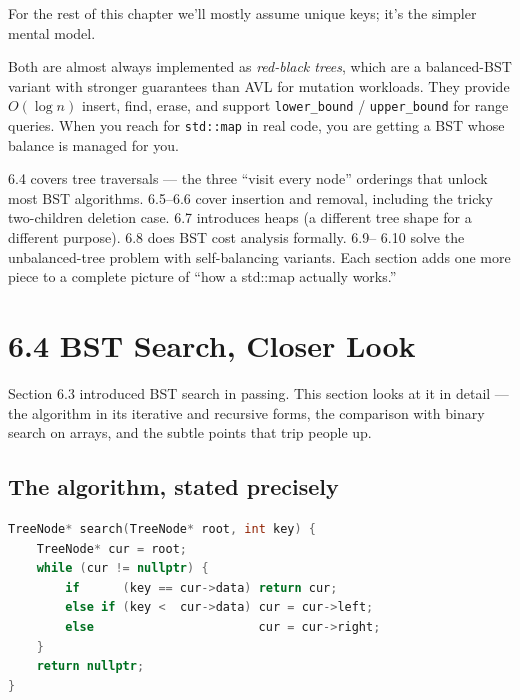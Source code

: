\documentclass[11pt]{article}
\begin{document}
For the rest of this chapter we'll mostly assume unique keys;
it's the simpler mental model.

\begin{notebox}
Both are almost always implemented as \emph{red-black trees},
which are a balanced-BST variant with stronger guarantees than
AVL for mutation workloads. They provide $O(\log n)$ insert,
find, erase, and support \texttt{lower\_bound} /
\texttt{upper\_bound} for range queries. When you reach for
\texttt{std::map} in real code, you are getting a BST whose
balance is managed for you.
\end{notebox}

\begin{ideabox}
6.4 covers tree traversals --- the three ``visit every node''
orderings that unlock most BST algorithms. 6.5--6.6 cover
insertion and removal, including the tricky two-children deletion
case. 6.7 introduces heaps (a different tree shape for a
different purpose). 6.8 does BST cost analysis formally. 6.9--
6.10 solve the unbalanced-tree problem with self-balancing
variants. Each section adds one more piece to a complete picture
of ``how a std::map actually works.''
\end{ideabox}

\section{6.4 BST Search, Closer Look}

Section 6.3 introduced BST search in passing. This section
looks at it in detail --- the algorithm in its iterative and
recursive forms, the comparison with binary search on arrays,
and the subtle points that trip people up.

\subsection*{The algorithm, stated precisely}

\begin{examplebox}
\begin{lstlisting}[language=C++,basicstyle=\ttfamily\small,frame=single]
TreeNode* search(TreeNode* root, int key) {
    TreeNode* cur = root;
    while (cur != nullptr) {
        if      (key == cur->data) return cur;
        else if (key <  cur->data) cur = cur->left;
        else                       cur = cur->right;
    }
    return nullptr;
}
\end{lstlisting}
\end{examplebox}
\end{document}
